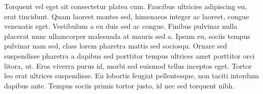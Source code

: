\documentclass[]{article}
\begin{document}
Torquent vel eget sit consectetur platea cum. Faucibus ultricies
adipiscing eu, erat tincidunt. Quam laoreet montes sed, himenaeos
integer ac laoreet, congue venenatis eget. Vestibulum a eu duis sed ac
congue. Finibus pulvinar nulla placerat nunc ullamcorper malesuada at
mauris sed a. Ipsum eu, sociis tempus pulvinar nam sed, class lorem
pharetra mattis sed sociosqu. Ornare sed suspendisse pharetra a dapibus
sed porttitor tempus ultrices amet porttitor orci litora, ut. Eros
viverra purus id, morbi sed euismod tellus inceptos eget. Tortor leo
erat ultrices suspendisse. Eu lobortis feugiat pellentesque, non taciti
interdum dapibus ante. Tempus sociis primis tortor justo, id nec sed
torquent nibh.
\end{document}
